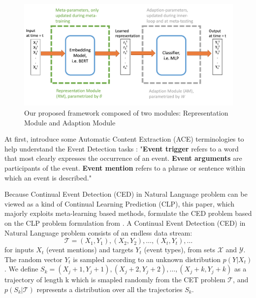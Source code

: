 
\begin{figure}[ht]
\centering
    \includegraphics[scale=0.6]{imgs/framework.jpg}
    \caption{Our proposed framework composed of two modules: Representation Module and Adaption Module}
    \label{img:1}
\end{figure}


At first, introduce some Automatic Content Extraction (ACE) terminologies to help understand the Event Detection tasks \citep{cao2020incremental}: "\textbf{Event trigger} refers to a word that most clearly expresses the occurrence of an event. \textbf{Event arguments} are participants of the event. \textbf{Event mention} refers to a phrase or sentence within which an event is described."

Because Continual Event Detection (CED) in Natural Language problem can be viewed as a kind of Continual Learning Prediction (CLP), this paper, which majorly exploits meta-learning based methods, formulate the CED problem based on the CLP problem formulation from \citet{javed2019meta}.
A Continual Event Detection (CED) in Natural Language problem consists of an endless data stream:
\[\mathcal{T} = (X_1, Y_1), (X_2, Y_2), \dots, (X_t, Y_t), \dots\]
for inputs $X_t$ (event mentions) and targets $Y_t$ (event types), from sets $\mathcal{X}$ and $\mathcal{Y}$. The random vector $Y_t$ is sampled
according to an unknown distribution $p(Y|X_t)$. We define $S_k = (X_j+1, Y_j+1), (X_j+2, Y_j+2), \dots, (X_j+k, Y_j+k)$ as a trajectory of length k which is smapled randomly from the CET problem $\mathcal{T}$, and $p(S_k|\mathcal{T})$ represents a distribution over all the trajectories $S_k$.

